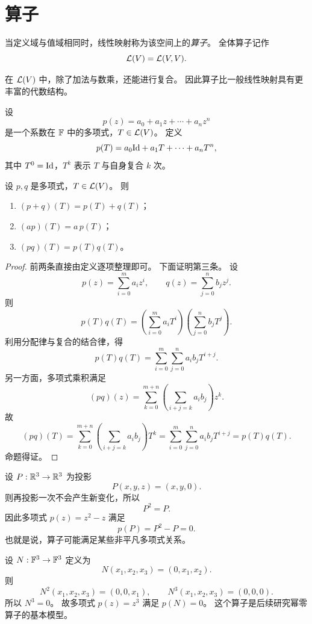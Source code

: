 \section{算子}

\begin{definition} 当定义域与值域相同时，线性映射称为该空间上的\emph{算子}。 全体算子记作 \[ \mathcal{L}(V)=\mathcal{L}(V,V). \]
\end{definition}

在 $\mathcal{L}(V)$ 中，除了加法与数乘，还能进行复合。 因此算子比一般线性映射具有更丰富的代数结构。

\begin{definition} 设 \[ p(z)=a_0+a_1z+\cdots+a_nz^n \] 是一个系数在 $\mathbb{F}$ 中的多项式，$T\in\mathcal{L}(V)$。
定义 \[ p(T)=a_0\mathrm{Id}+a_1T+\cdots+a_nT^n, \] 其中 $T^0=\mathrm{Id}$，$T^k$ 表示 $T$ 与自身复合 $k$ 次。
\end{definition}

\begin{proposition} 设 $p,q$ 是多项式，$T\in\mathcal{L}(V)$。 则 \begin{enumerate}[label=(\arabic*)]
\item $(p+q)(T)=p(T)+q(T)$； \item $(ap)(T)=a\,p(T)$； \item $(pq)(T)=p(T)q(T)$。
\end{enumerate} \end{proposition}

\begin{proof} 前两条直接由定义逐项整理即可。 下面证明第三条。 设 \[ p(z)=\sum_{i=0}^m a_iz^i, \qquad
q(z)=\sum_{j=0}^n b_jz^j. \] 则 \[ p(T)q(T)=\left(\sum_{i=0}^m
a_iT^i\right)\left(\sum_{j=0}^n b_jT^j\right). \] 利用分配律与复合的结合律，得 \[
p(T)q(T)=\sum_{i=0}^m\sum_{j=0}^n a_ib_jT^{i+j}. \] 另一方面，多项式乘积满足 \[
(pq)(z)=\sum_{k=0}^{m+n}\left(\sum_{i+j=k}a_ib_j\right)z^k. \] 故 \[
(pq)(T)=\sum_{k=0}^{m+n}\left(\sum_{i+j=k}a_ib_j\right)T^k= \sum_{i=0}^m\sum_{j=0}^n
a_ib_jT^{i+j}=p(T)q(T). \] 命题得证。 \end{proof}

\begin{example} 设 $P:\mathbb{R}^3\to\mathbb{R}^3$ 为投影 \[ P(x,y,z)=(x,y,0). \] 则再投影一次不会产生新变化，所以 \[ P^2=P.
\] 因此多项式 $p(z)=z^2-z$ 满足 \[ p(P)=P^2-P=0. \] 也就是说，算子可能满足某些非平凡多项式关系。 \end{example}

\begin{example} 设 $N:\mathbb{F}^3\to\mathbb{F}^3$ 定义为 \[ N(x_1,x_2,x_3)=(0,x_1,x_2). \] 则 \[
N^2(x_1,x_2,x_3)=(0,0,x_1), \qquad N^3(x_1,x_2,x_3)=(0,0,0). \] 所以 $N^3=0$。 故多项式
$p(z)=z^3$ 满足 $p(N)=0$。 这个算子是后续研究幂零算子的基本模型。 \end{example}

